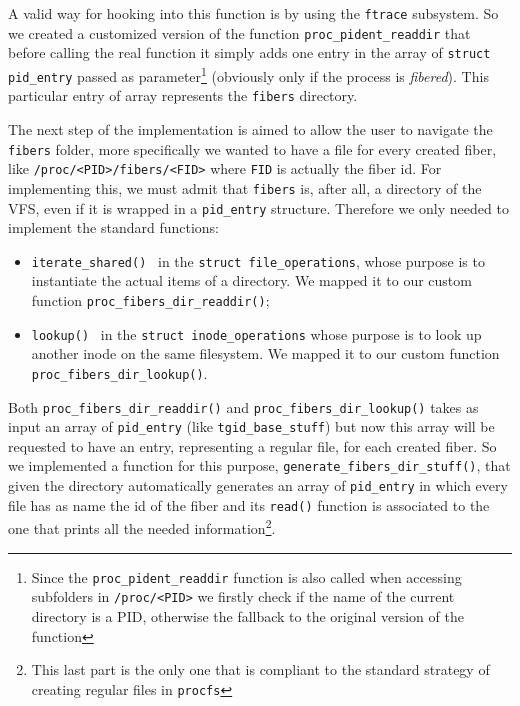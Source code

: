 \documentclass[a4paper,10pt]{article}
\begin{document}
  A valid way for hooking into this function is by using the \lstinline{ftrace} subsystem. So we created a customized version of the function \lstinline{proc_pident_readdir} that before calling the real function it simply adds one entry in the array of \lstinline{struct pid_entry} passed as parameter\footnote{Since the \lstinline{proc_pident_readdir} function is also called when accessing subfolders in \lstinline{/proc/<PID>} we firstly check if the name of the current directory is a PID, otherwise the fallback to the original version of the function} (obviously only if the process is \textit{fibered}). This particular entry of array represents the \texttt{fibers} directory.

  The next step of the implementation is aimed to allow the user to navigate the \texttt{fibers} folder, more specifically we wanted to have a file for every created fiber, like \lstinline{/proc/<PID>/fibers/<FID>} where \texttt{FID} is actually the fiber id. For implementing this, we must admit that \texttt{fibers} is, after all, a directory of the VFS, even if it is wrapped in a \lstinline{pid_entry} structure. Therefore we only needed to implement the standard functions:
  \begin{itemize}
    \item \lstinline{iterate_shared()}~\cite{kern_file_ops_iterate} in the \lstinline{struct file_operations}, whose purpose is to instantiate the actual items of a directory. We mapped it to our custom function \lstinline{proc_fibers_dir_readdir()};
    \item \lstinline{lookup()}~\cite{kern_inode_ops_lookup} in the \lstinline{struct inode_operations} whose purpose is to look up another inode on the same filesystem. We mapped it to our custom function \lstinline{proc_fibers_dir_lookup()}.
  \end{itemize}
  Both \lstinline{proc_fibers_dir_readdir()} and \lstinline{proc_fibers_dir_lookup()} takes as input an array of \lstinline{pid_entry} (like \lstinline{tgid_base_stuff}) but now this array will be requested to have an entry, representing a regular file, for each created fiber. So we implemented a function for this purpose, \lstinline{generate_fibers_dir_stuff()}, that given the directory automatically generates an array of \lstinline{pid_entry} in which every file has as name the id of the fiber and its \lstinline{read()} function is associated to the one that prints all the needed information\footnote{This last part is the only one that is compliant to the standard strategy of creating regular files in \texttt{procfs}}.
\end{document}
